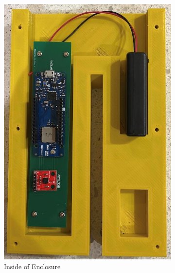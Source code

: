 \begin{figure}[H]
	\centering
	\begin{subfigure}{.5\textwidth}
		\centering 
		\includegraphics[scale=0.3]{Sections/Design-Process/enclosure-inside.jpg}
		\caption{Inside of Enclosure}
		\label{enclosure-inside}
	\end{subfigure}%
	\begin{subfigure}{.5\textwidth}
		\centering

\end{subfigure}
\end{figure}

